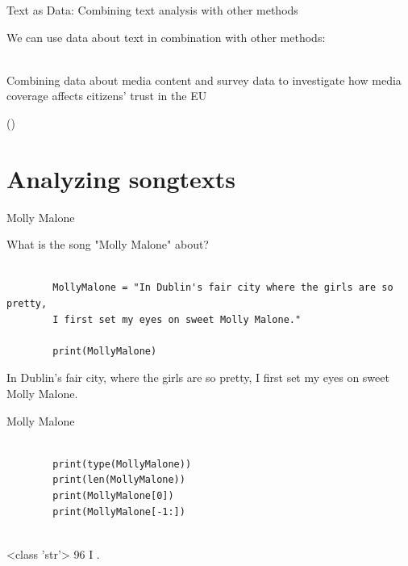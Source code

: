\documentclass[handout]{beamer}
\begin{document}
\begin{frame}{Text as Data: \small{Combining text analysis with other methods}}
	
	We can use data about text in combination with other methods: \\~
	
	Combining data about media content and survey data to investigate how media coverage affects citizens' trust in the EU \\
	\begin{tiny}
		(\cite{brosius_trust_2019}) \\
	\end{tiny}
	
	
	
\end{frame}


\section{Analyzing songtexts}

\begin{frame}[fragile]{Molly Malone}
	
	What is the song "Molly Malone" about? 
	\begin{lstlisting}

		MollyMalone = "In Dublin's fair city where the girls are so pretty,
		I first set my eyes on sweet Molly Malone." 
		
		print(MollyMalone)

	\end{lstlisting}
	
	\begin{lstlistingoutput}
		In Dublin's fair city, where the girls are so pretty, I first set my eyes on sweet Molly Malone.
	\end{lstlistingoutput}
\end{frame}


\begin{frame}[fragile]{Molly Malone}
	
	\begin{lstlisting}
		
		print(type(MollyMalone))
		print(len(MollyMalone))
		print(MollyMalone[0])
		print(MollyMalone[-1:])
		
	\end{lstlisting}
	
	\begin{lstlistingoutput}
		<class 'str'>
		96
		I
		.
	\end{lstlistingoutput}

\end{frame}
\end{document}
